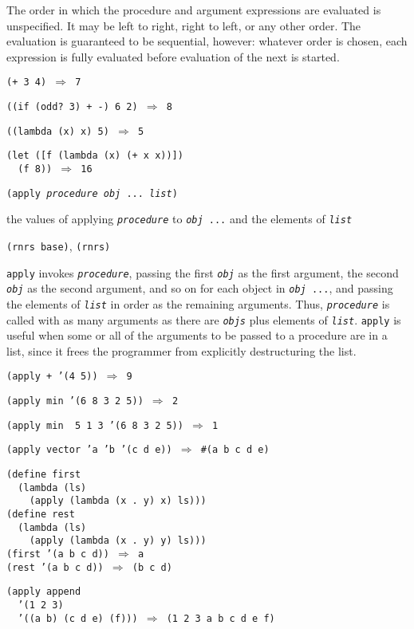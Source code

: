 \label{control_s2}The order in which the procedure and argument
expressions are evaluated is unspecified.
It may be left to right, right to left, or any other order.
The evaluation is guaranteed to be sequential, however: whatever order
is chosen, each expression is fully evaluated before evaluation of
the next is started.


\begin{alltt}
(+ 3 4) \(\Rightarrow\) 7

((if (odd? 3) + -) 6 2) \(\Rightarrow\) 8

((lambda (x) x) 5) \(\Rightarrow\) 5

(let ([f (lambda (x) (+ x x))])
  (f 8)) \(\Rightarrow\) 16
\end{alltt}

\begin{description}

\label{control_s3}\label{control_desc_apply}
\item[procedure] \texttt{(apply \textit{procedure} \textit{obj} ... \textit{list})}



\item[returns] the values of applying \texttt{\textit{procedure}} to \texttt{\textit{obj} ...} and
the elements of \texttt{\textit{list}}


\item[libraries] \texttt{(rnrs base)}, \texttt{(rnrs)}
\end{description}

\texttt{apply} invokes \texttt{\textit{procedure}}, passing
the first \texttt{\textit{obj}} as the first argument,
the second \texttt{\textit{obj}} as the second argument, and
so on for each object in \texttt{\textit{obj} ...}, and passing the elements of
\texttt{\textit{list}} in order as the remaining arguments.
Thus, \texttt{\textit{procedure}} is called with as many arguments as there are
\texttt{\textit{objs}} plus elements of \texttt{\textit{list}}.
\texttt{apply} is useful when some or all of the arguments to be passed to
a procedure are in a list, since it frees the programmer from
explicitly destructuring the list.

\begin{alltt}
(apply + '(4 5)) \(\Rightarrow\) 9

(apply min '(6 8 3 2 5)) \(\Rightarrow\) 2

(apply min  5 1 3 '(6 8 3 2 5)) \(\Rightarrow\) 1

(apply vector 'a 'b '(c d e)) \(\Rightarrow\) \#{}(a b c d e)

(define first
  (lambda (ls)
    (apply (lambda (x . y) x) ls)))
(define rest
  (lambda (ls)
    (apply (lambda (x . y) y) ls)))
(first '(a b c d)) \(\Rightarrow\) a
(rest '(a b c d)) \(\Rightarrow\) (b c d)

(apply append
  '(1 2 3)
  '((a b) (c d e) (f))) \(\Rightarrow\) (1 2 3 a b c d e f)
\end{alltt}

